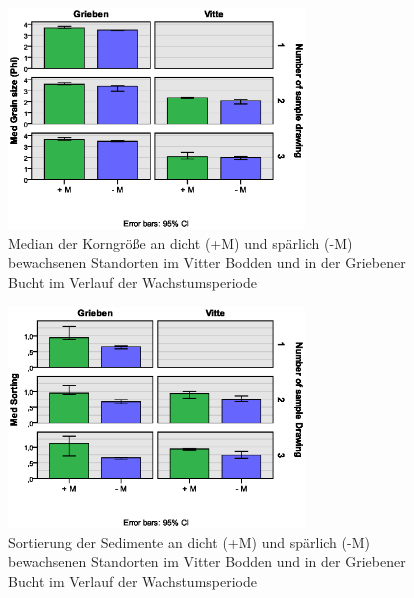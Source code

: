 \begin{figure}[htb]
\centering
\includegraphics[width=0.70\textwidth]{images/sedimentparameter/S-Parameter_MD_KG_neu1.eps}
\caption[Median der Korngröße Grieben und Vitte]{Median der Korngröße an dicht (+M) und spärlich (-M) bewachsenen Standorten im Vitter Bodden und in der Griebener Bucht im Verlauf der Wachstumsperiode}
\label{fig:md_korngröße}
\end{figure}


\begin{figure}[htb]
\centering
\includegraphics[width=0.70\textwidth]{images/sedimentparameter/S_Parameter_Sortierung_neu1.eps}
\caption[Sortierung der Sedimente in Grieben und Vitte]{Sortierung der Sedimente an dicht (+M) und spärlich (-M) bewachsenen Standorten im Vitter Bodden und in der Griebener Bucht im Verlauf der Wachstumsperiode}
\label{fig:sortierung}
\end{figure}



